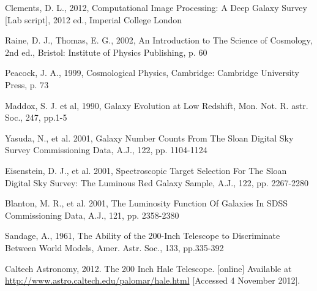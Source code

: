 \documentclass[a4paper,11pt,twoside]{article}
\begin{document}
\begin{thebibliography}{9}

Clements, D. L., 2012, Computational Image Processing: A Deep Galaxy Survey [Lab script], 2012 ed., Imperial College London

Raine, D. J., Thomas, E. G., 2002, An Introduction to The Science of Cosmology, 2nd ed., Bristol: Institute of Physics Publishing, p. 60

Peacock, J. A., 1999, Cosmological Physics, Cambridge: Cambridge University Press, p. 73

Maddox, S. J. et al, 1990, Galaxy Evolution at Low Redshift, Mon. Not. R. astr. Soc., 247, pp.1-5

Yasuda, N., et al. 2001, Galaxy Number Counts From The Sloan Digital Sky Survey Commissioning Data, A.J., 122, pp. 1104-1124

Eisenstein, D. J., et al. 2001, Spectroscopic Target Selection For The Sloan Digital Sky Survey: The Luminous Red Galaxy Sample, A.J., 122, pp. 2267-2280

Blanton, M. R., et al. 2001, The Luminosity Function Of Galaxies In SDSS Commissioning Data, A.J., 121, pp. 2358-2380

Sandage, A., 1961, The Ability of the 200-Inch Telescope to Discriminate Between World Models, Amer. Astr. Soc., 133, pp.335-392

Caltech Astronomy, 2012. The 200 Inch Hale Telescope. [online] Available at \url{http://www.astro.caltech.edu/palomar/hale.html}
[Accessed 4 November 2012].

\end{thebibliography}
\end{document}
